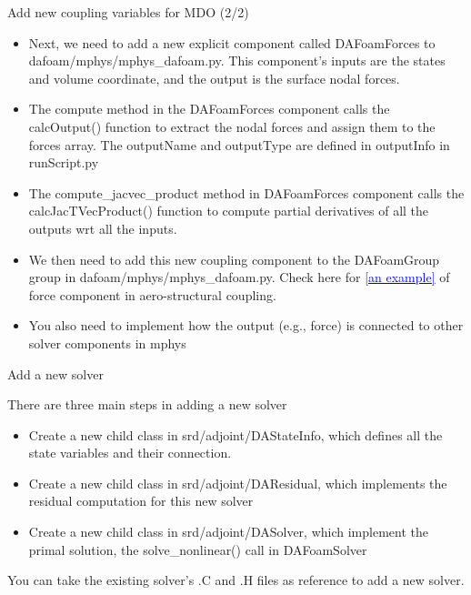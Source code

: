 \documentclass{bredelebeamer}
\begin{document}
\begin{frame}[fragile]{Add new coupling variables for MDO (2/2)}

\begin{itemize}
  \item Next, we need to add a new explicit component called DAFoamForces to dafoam/mphys/mphys\_dafoam.py. This component's inputs are the states and volume coordinate, and the output is the surface nodal forces.
  \item The compute method in the DAFoamForces component calls the calcOutput() function to extract the nodal forces and assign them to the forces array. The outputName and outputType are defined in outputInfo in runScript.py
  \item The compute\_jacvec\_product method in DAFoamForces component calls the calcJacTVecProduct() function to compute partial derivatives of all the outputs wrt all the inputs.
  \item We then need to add this new coupling component to the DAFoamGroup group in dafoam/mphys/mphys\_dafoam.py. Check here for \href{https://github.com/mdolab/dafoam/blob/27d7279e32e62fa2c65399f3441836aefc8401c5/dafoam/mphys/mphys_dafoam.py#L166}{\textcolor{blue}{[an example]}} of force component in aero-structural coupling.
  \item You also need to implement how the output (e.g., force) is connected to other solver components in mphys
\end{itemize}

\end{frame}


\begin{frame}[fragile]{Add a new solver}

There are three main steps in adding a new solver
\begin{itemize}
  \setlength\itemsep{0.5em}
  \item Create a new child class in srd/adjoint/DAStateInfo, which defines all the state variables and their connection.
  \item Create a new child class in srd/adjoint/DAResidual, which implements the residual computation for this new solver
  \item Create a new child class in srd/adjoint/DASolver, which implement the primal solution, the solve\_nonlinear() call in DAFoamSolver
\end{itemize}

You can take the existing solver's .C and .H files as reference to add a new solver.
  
\end{frame}
\end{document}
